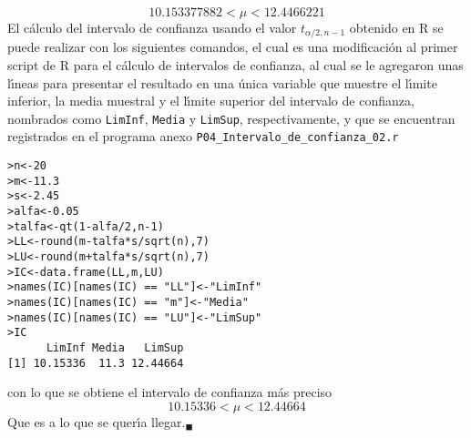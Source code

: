 \begin{solucion}
 \begin{equation*}
  10.153377882 < \mu < 12.4466221
 \end{equation*}
 El c\'alculo del intervalo de confianza usando el valor $t_{\alpha/2,n-1}$ obtenido en R se puede realizar con los siguientes comandos, el cual es una modificaci\'on al primer script de R para el c\'alculo de intervalos de confianza, al cual se le agregaron unas l\'{\i}neas para presentar el resultado en una \'unica variable que muestre el l\'{\i}mite inferior, la media muestral y el l\'{\i}mite superior del intervalo de confianza, nombrados como \texttt{LimInf}, \texttt{Media} y \texttt{LimSup}, respectivamente, y que se encuentran registrados en el programa anexo \texttt{P04\_Intervalo\_de\_confianza\_02.r}
 \begin{verbatim}
>n<-20
>m<-11.3
>s<-2.45
>alfa<-0.05
>talfa<-qt(1-alfa/2,n-1)
>LL<-round(m-talfa*s/sqrt(n),7)
>LU<-round(m+talfa*s/sqrt(n),7)
>IC<-data.frame(LL,m,LU)
>names(IC)[names(IC) == "LL"]<-"LimInf"
>names(IC)[names(IC) == "m"]<-"Media"
>names(IC)[names(IC) == "LU"]<-"LimSup"
>IC
      LimInf Media   LimSup
[1] 10.15336  11.3 12.44664
 \end{verbatim}
 \vspace{-0.5cm}
 con lo que se obtiene el intervalo de confianza m\'as preciso
 \begin{equation*}
  10.15336 < \mu < 12.44664
 \end{equation*}
 Que es a lo que se quer\'{\i}a llegar.${}_{\blacksquare}$
\end{solucion}
